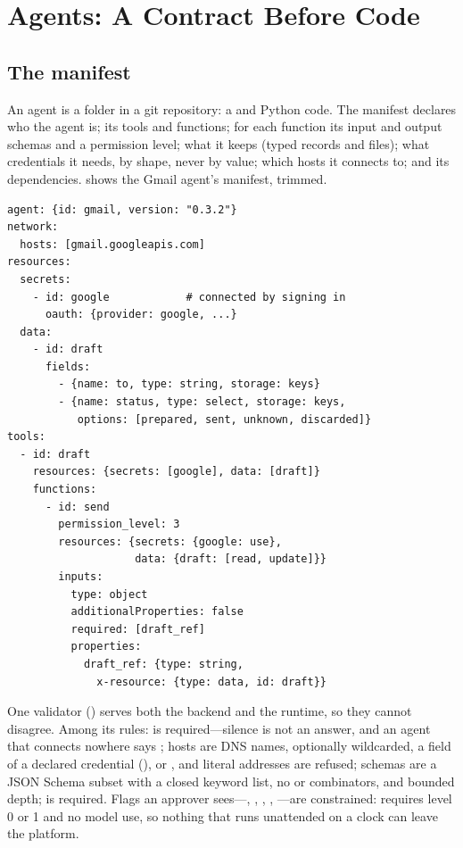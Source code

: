 \section{Agents: A Contract Before Code}
\label{sec:agents}

\subsection{The manifest}

An agent is a folder in a git repository: a  and
Python code. The manifest declares who the agent is; its tools and
functions; for each function its input and output schemas and a
permission level; what it keeps (typed records and files); what
credentials it needs, by shape, never by value; which hosts it connects
to; and its dependencies.  shows the Gmail agent's
manifest, trimmed.

\begin{lstlisting}[caption={Excerpt of the Gmail agent's manifest.},label=lst:manifest,captionpos=b,float=t]
agent: {id: gmail, version: "0.3.2"}
network:
  hosts: [gmail.googleapis.com]
resources:
  secrets:
    - id: google            # connected by signing in
      oauth: {provider: google, ...}
  data:
    - id: draft
      fields:
        - {name: to, type: string, storage: keys}
        - {name: status, type: select, storage: keys,
           options: [prepared, sent, unknown, discarded]}
tools:
  - id: draft
    resources: {secrets: [google], data: [draft]}
    functions:
      - id: send
        permission_level: 3
        resources: {secrets: {google: use},
                    data: {draft: [read, update]}}
        inputs:
          type: object
          additionalProperties: false
          required: [draft_ref]
          properties:
            draft_ref: {type: string,
              x-resource: {type: data, id: draft}}
\end{lstlisting}

One validator () serves both the
backend and the runtime, so they cannot disagree. Among its rules:
 is required---silence is not an answer, and an agent
that connects nowhere says ; hosts are DNS names,
optionally wildcarded, a field of a declared credential
(), or , and literal addresses are refused;
schemas are a JSON Schema subset with a closed keyword list, no
 or combinators, and bounded depth; 
is required. Flags an approver sees---, ,
, , ---are constrained:
 requires level 0 or 1 and no model use, so nothing
that runs unattended on a clock can leave the platform.

